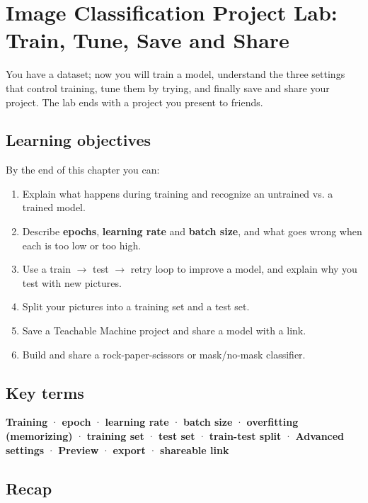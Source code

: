 \chapter{Image Classification Project Lab: Train, Tune, Save and Share}

\begin{glancebox}
You have a dataset; now you will train a model, understand the three settings that control training, tune them by trying, and finally save and share your project. The lab ends with a project you present to friends.
\end{glancebox}

\section*{Learning objectives}

By the end of this chapter you can:


\begin{enumerate}
\item Explain what happens during training and recognize an untrained vs. a trained model.
\item Describe \textbf{epochs}, \textbf{learning rate} and \textbf{batch size}, and what goes wrong when each is too low or too high.
\item Use a train \ensuremath{\rightarrow} test \ensuremath{\rightarrow} retry loop to improve a model, and explain why you test with new pictures.
\item Split your pictures into a training set and a test set.
\item Save a Teachable Machine project and share a model with a link.
\item Build and share a rock-paper-scissors or mask/no-mask classifier.
\end{enumerate}

\section*{Key terms}

\textbf{Training} · \textbf{epoch} · \textbf{learning rate} · \textbf{batch size} · \textbf{overfitting (memorizing)} · \textbf{training set} · \textbf{test set} · \textbf{train-test split} · \textbf{Advanced settings} · \textbf{Preview} · \textbf{export} · \textbf{shareable link}


\section{Recap}

